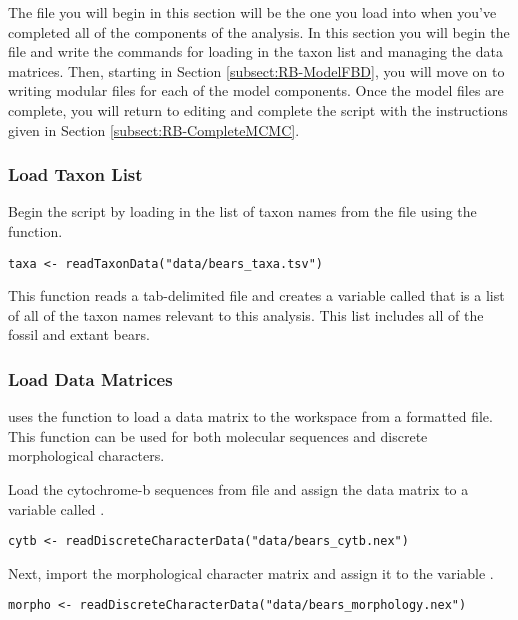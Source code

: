 The file you will begin in this section will be the one you load into \RevBayes when you've completed all of the components of the analysis.
In this section you will begin the file and write the \Rev commands for loading in the taxon list and managing the data matrices.
Then, starting in Section \ref{subsect:RB-ModelFBD}, you will move on to writing modular files for each of the model components. 
Once the model files are complete, you will return to editing  and complete the \Rev script with the instructions given in Section \ref{subsect:RB-CompleteMCMC}.

\medskip
\subsubsection{Load Taxon List}\label{subsub:RB-TaxList}

Begin the \Rev script by loading in the list of taxon names from the  file using the  function.
\begin{snugshade*}
\begin{lstlisting}
taxa <- readTaxonData("data/bears_taxa.tsv")
\end{lstlisting}
\end{snugshade*}
This function reads a tab-delimited file and creates a variable called  that is a list of all of the taxon names relevant to this analysis. 
This list includes all of the fossil and extant bears.



\medskip
\subsubsection{Load Data Matrices}\label{subsub:RB-LoadData}

\RevBayes uses the function  to load a data matrix to the workspace from a formatted file. 
This function can be used for both molecular sequences and discrete morphological characters.

Load the cytochrome-b sequences from file and assign the data matrix to a variable called .
{\tt \begin{snugshade*}
\begin{lstlisting}
cytb <- readDiscreteCharacterData("data/bears_cytb.nex") 
\end{lstlisting}
\end{snugshade*}}

Next, import the morphological character matrix and assign it to the variable . 
{\tt \begin{snugshade*}
\begin{lstlisting}
morpho <- readDiscreteCharacterData("data/bears_morphology.nex")
\end{lstlisting}
\end{snugshade*}}

